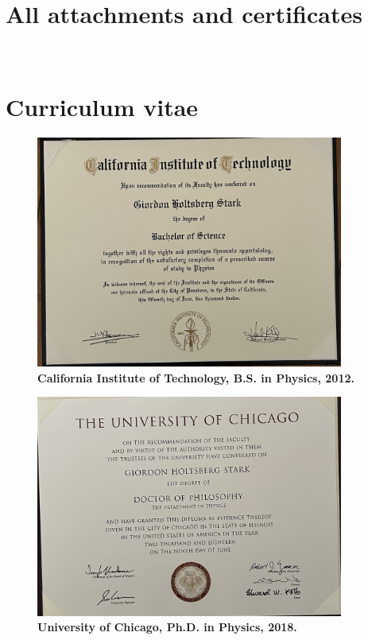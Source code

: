 


\setcounter{chapter}{8}
\chapter{All attachments and certificates}
\, \\

\begingroup
\let\clearpage\relax
\tableofcontents*
\endgroup

\clearpage

\setcounter{chapter}{1}
\chapter{Curriculum vitae}
\begin{figure}[h!]
	\centering
	\caption{\textbf{California Institute of Technology, B.S. in Physics, 2012.}}
	\includegraphics[width=0.9\textwidth]{attachments/B-CV/BS}
\end{figure}

\begin{figure}[h!]
	\centering
	\caption{\textbf{University of Chicago, Ph.D. in Physics, 2018.}}
	\includegraphics[width=0.9\textwidth]{attachments/B-CV/PhD}
\end{figure}

